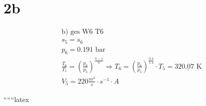 

\section*{2b}

\begin{align*}
    &\text{b) ges W6 T6} \\
    &s_5 = s_6 \\
    &p_6 = 0.191 \text{ bar} \\
    &\frac{T_6}{T_5} = \left(\frac{p_6}{p_5}\right)^{\frac{n-1}{n}} \Rightarrow T_6 = \left(\frac{p_6}{p_5}\right)^{\frac{0.4}{1.4}} \cdot T_5 = 32 \underline{0.07} \text{ K} \\
    &V_5 = 220 \frac{m^3}{s} \cdot s^{-1} \cdot A
\end{align*}

``````latex
